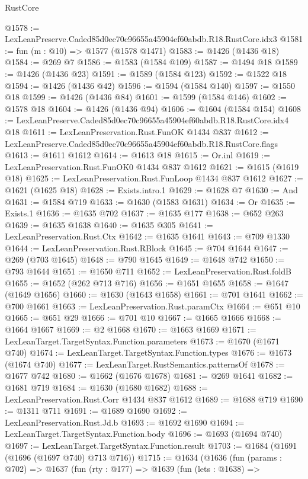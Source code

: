\begin{lexlean}{RustCore}
\begin{coremodule}
@1578 := LexLeanPreserve.Caded85d0ec70c96655a45904ef60abdb.R18.RustCore.idx3
@1581 := fun (m : @10) => @1577 (@1578 @1471)
@1583 := @1426 (@1436 @18)
@1584 := @269 @7
@1586 := @1583 (@1584 @109)
@1587 := @1494 @18
@1589 := @1426 (@1436 @23)
@1591 := @1589 (@1584 @123)
@1592 := @1522 @18
@1594 := @1426 (@1436 @42)
@1596 := @1594 (@1584 @140)
@1597 := @1550 @18
@1599 := @1426 (@1436 @84)
@1601 := @1599 (@1584 @146)
@1602 := @1578 @18
@1604 := @1426 (@1436 @94)
@1606 := @1604 (@1584 @154)
@1608 := LexLeanPreserve.Caded85d0ec70c96655a45904ef60abdb.R18.RustCore.idx4 @18
@1611 := LexLeanPreservation.Rust.FunOK @1434 @837
@1612 := LexLeanPreserve.Caded85d0ec70c96655a45904ef60abdb.R18.RustCore.flags
@1613 := @1611 @1612
@1614 := @1613 @18
@1615 := Or.inl
@1619 := LexLeanPreservation.Rust.FunOK0 @1434 @837 @1612
@1621 := @1615 (@1619 @18)
@1625 := LexLeanPreservation.Rust.FunLoop @1434 @837 @1612
@1627 := @1621 (@1625 @18)
@1628 := Exists.intro.{1}
@1629 := @1628 @7
@1630 := And
@1631 := @1584 @719
@1633 := @1630 (@1583 @1631)
@1634 := Or
@1635 := Exists.{1}
@1636 := @1635 @702
@1637 := @1635 @177
@1638 := @652 @263
@1639 := @1635 @1638
@1640 := @1635 @305
@1641 := LexLeanPreservation.Rust.Ctx
@1642 := @1635 @1641
@1643 := @709 @1330
@1644 := LexLeanPreservation.Rust.RBlock
@1645 := @704 @1644
@1647 := @269 (@703 @1645)
@1648 := @790 @1645
@1649 := @1648 @742
@1650 := @793 @1644
@1651 := @1650 @711
@1652 := LexLeanPreservation.Rust.foldB
@1655 := @1652 (@262 @713 @716)
@1656 := @1651 @1655
@1658 := @1647 (@1649 @1656)
@1660 := @1630 (@1643 @1658)
@1661 := @701 @1641
@1662 := @700 @1661
@1663 := LexLeanPreservation.Rust.paramCtx
@1664 := @651 @10
@1665 := @651 @29
@1666 := @701 @10
@1667 := @1665 @1666
@1668 := @1664 @1667
@1669 := @2 @1668
@1670 := @1663 @1669
@1671 := LexLeanTarget.TargetSyntax.Function.parameters
@1673 := @1670 (@1671 @740)
@1674 := LexLeanTarget.TargetSyntax.Function.types
@1676 := @1673 (@1674 @740)
@1677 := LexLeanTarget.RustSemantics.patternsOf
@1678 := @1677 @742
@1680 := @1662 (@1676 @1678)
@1681 := @269 @1641
@1682 := @1681 @719
@1684 := @1630 (@1680 @1682)
@1688 := LexLeanPreservation.Rust.Corr @1434 @837 @1612
@1689 := @1688 @719
@1690 := @1311 @711
@1691 := @1689 @1690
@1692 := LexLeanPreservation.Rust.Jd.b
@1693 := @1692 @1690
@1694 := LexLeanTarget.TargetSyntax.Function.body
@1696 := @1693 (@1694 @740)
@1697 := LexLeanTarget.TargetSyntax.Function.result
@1703 := @1684 (@1691 (@1696 (@1697 @740) @713 @716))
@1715 := @1634
    (@1636
      (fun (params : @702) =>
      @1637
        (fun (rty : @177) =>
        @1639
          (fun (lets : @1638) =>

\end{coremodule}
\end{lexlean}
